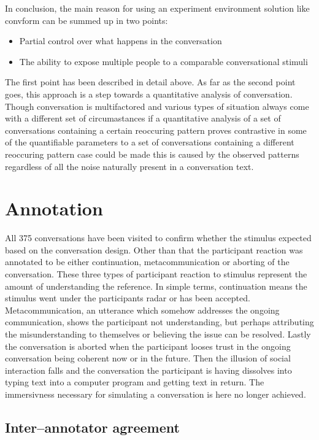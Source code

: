 \documentclass[12pt]{report}
\begin{document}
{In conclusion, the main reason for using
an experiment environment solution like convform
can be summed up in two points:

\begin{itemize}
\item{Partial control over what happens in the conversation}
\item{The ability to expose multiple people to a comparable conversational stimuli}
\end{itemize}

The first point has been described in detail above.
As far as the second point goes,
this approach is a step towards
a quantitative analysis of conversation.
Though conversation is multifactored
and various types of situation
always come with a different set of circumastances
if a quantitative analysis of a set of conversations
containing a certain reoccuring pattern
proves contrastive in some of the quantifiable parameters
to a set of conversations containing a different reoccuring pattern
case could be made this is caused by the observed patterns
regardless of all the noise naturally present in a conversation text.

\section{Annotation}

All 375 conversations have been visited to confirm whether
the stimulus expected based on the conversation design.
Other than that the participant reaction was annotated to be either
continuation, metacommunication or aborting of the conversation.
These three types of participant reaction to stimulus
represent the amount of understanding the reference.
In simple terms, continuation means
the stimulus went under the participants radar
or has been accepted.
Metacommunication, an utterance which somehow addresses the ongoing communication,
shows the participant not understanding,
but perhaps attributing the misunderstanding to themselves or
believing the issue can be resolved.
Lastly the conversation is aborted when the participant looses trust
in the ongoing conversation being coherent now or in the future.
Then the illusion of social interaction falls
and the conversation the participant is having dissolves into
typing text into a computer program and getting text in return.
The immersivness necessary for simulating a conversation is here no longer achieved.

\subsection{Inter--annotator agreement}

}
\end{document}
